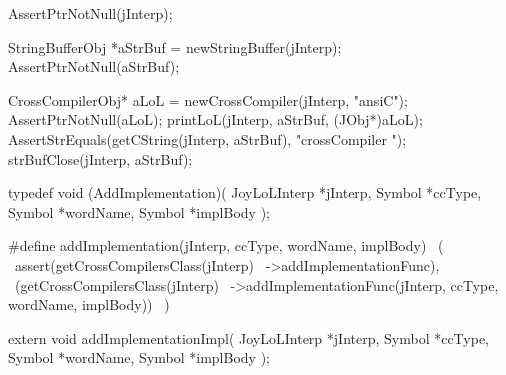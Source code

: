 \startCTest
  AssertPtrNotNull(jInterp);

  StringBufferObj *aStrBuf = newStringBuffer(jInterp);
  AssertPtrNotNull(aStrBuf);

  CrossCompilerObj* aLoL =
    newCrossCompiler(jInterp, "ansiC");
  AssertPtrNotNull(aLoL);
  printLoL(jInterp, aStrBuf, (JObj*)aLoL);
  AssertStrEquals(getCString(jInterp, aStrBuf), "crossCompiler ");
  strBufClose(jInterp, aStrBuf);
\stopCTest
\stopTestCase

\stopTestSuite

\startTestSuite[addImplementation]

\startCHeader
typedef void (AddImplementation)(
  JoyLoLInterp *jInterp,
  Symbol       *ccType,
  Symbol       *wordName,
  Symbol       *implBody
);

#define addImplementation(jInterp, ccType, wordName, implBody)      \
  (                                                                 \
    assert(getCrossCompilersClass(jInterp)                          \
      ->addImplementationFunc),                                     \
    (getCrossCompilersClass(jInterp)                                \
      ->addImplementationFunc(jInterp, ccType, wordName, implBody)) \
  )
\stopCHeader

\setCHeaderStream{private}
\startCHeader
extern void addImplementationImpl(
  JoyLoLInterp *jInterp,
  Symbol       *ccType,
  Symbol       *wordName,
  Symbol       *implBody
);
\stopCHeader
\setCHeaderStream{public}

